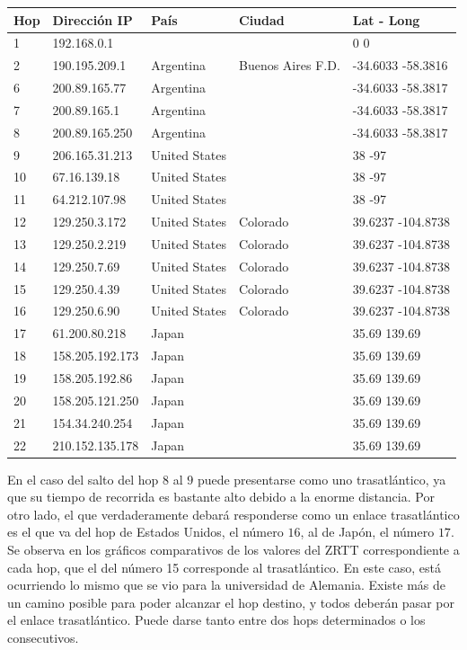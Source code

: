 \begin{center}
 \begin{tabular}{|l|l|l|l|l|}
    \hline
    Hop &Dirección IP &País &Ciudad &Lat - Long \\ \hline \hline
    1 & 192.168.0.1 &  &  & 0 0 \\ \hline
    2 & 190.195.209.1 & Argentina & Buenos Aires F.D. & -34.6033 -58.3816 \\ \hline
    6 & 200.89.165.77 & Argentina &  & -34.6033 -58.3817 \\ \hline
    7 & 200.89.165.1 & Argentina &  & -34.6033 -58.3817 \\ \hline
    8 & 200.89.165.250 & Argentina &  & -34.6033 -58.3817 \\ \hline
    9 & 206.165.31.213 & United States &  & 38 -97 \\ \hline
    10 & 67.16.139.18 & United States &  & 38 -97 \\ \hline
    11 & 64.212.107.98 & United States &  & 38 -97 \\ \hline
    12 & 129.250.3.172 & United States & Colorado & 39.6237 -104.8738 \\ \hline
    13 & 129.250.2.219 & United States & Colorado & 39.6237 -104.8738 \\ \hline
    14 & 129.250.7.69 & United States & Colorado & 39.6237 -104.8738 \\ \hline
    15 & 129.250.4.39 & United States & Colorado & 39.6237 -104.8738 \\ \hline
    16 & 129.250.6.90 & United States & Colorado & 39.6237 -104.8738 \\ \hline
    17 & 61.200.80.218 & Japan &  & 35.69 139.69 \\ \hline
    18 & 158.205.192.173 & Japan &  & 35.69 139.69 \\ \hline
    19 & 158.205.192.86 & Japan &  & 35.69 139.69 \\ \hline
    20 & 158.205.121.250 & Japan &  & 35.69 139.69 \\ \hline
    21 & 154.34.240.254 & Japan &  & 35.69 139.69 \\ \hline
    22 & 210.152.135.178 & Japan &  & 35.69 139.69 \\ \hline
 \end{tabular}
\end{center}

En el caso del salto del hop $8$ al $9$ puede presentarse como uno trasatlántico, ya que su tiempo de recorrida es bastante alto debido a la enorme distancia. Por otro lado, el que verdaderamente debará responderse como un enlace trasatlántico es el que va del hop de Estados Unidos, el número $16$, al de Japón, el número $17$. Se observa en los gráficos comparativos de los valores del ZRTT correspondiente a cada hop, que el del número 15 corresponde al trasatlántico. En este caso, está ocurriendo lo mismo que se vio para la universidad de Alemania. Existe más de un camino posible para poder alcanzar el hop destino, y todos deberán pasar por el enlace trasatlántico. Puede darse tanto entre dos hops determinados o los consecutivos. 

